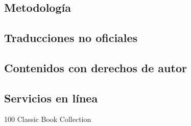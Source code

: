 
\appendix
\section{\appendixname}
\frame{\tableofcontents}

\subsection{Metodología}
\begin{frame}

\end{frame}

\subsection{Traducciones no oficiales}
\begin{frame}
\end{frame}

\subsection{Contenidos con derechos de autor}
\begin{frame}
\end{frame}

\subsection{Servicios en línea}
\begin{frame}{100 Classic Book Collection}

\end{frame}
